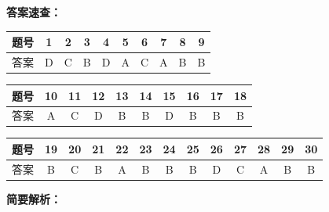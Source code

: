 \documentclass[12pt, a4paper]{article}
\begin{document}
\begin{answerbox}

\textbf{答案速查：}

\begin{center}
\begin{tabular}{|c|c|c|c|c|c|c|c|c|c|}
\hline
题号 & 1 & 2 & 3 & 4 & 5 & 6 & 7 & 8 & 9 \\
\hline
答案 & D & C & B & D & A & C & A & B & B \\
\hline
\end{tabular}

\vspace{4pt}

\begin{tabular}{|c|c|c|c|c|c|c|c|c|c|}
\hline
题号 & 10 & 11 & 12 & 13 & 14 & 15 & 16 & 17 & 18 \\
\hline
答案 & A & C & D & B & B & D & B & B & B \\
\hline
\end{tabular}

\vspace{4pt}

\begin{tabular}{|c|c|c|c|c|c|c|c|c|c|c|c|c|}
\hline
题号 & 19 & 20 & 21 & 22 & 23 & 24 & 25 & 26 & 27 & 28 & 29 & 30 \\
\hline
答案 & B & C & B & A & B & B & B & D & C & A & B & B \\
\hline
\end{tabular}
\end{center}

\vspace{8pt}
\textbf{简要解析：}


\end{answerbox}
\end{document}

